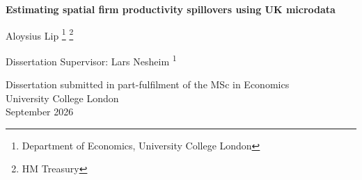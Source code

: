\begin{titlepage}
\vspace*{5cm}
\begin{center}
    \huge\textbf{
        Estimating spatial firm productivity spillovers using UK microdata
    }
\end{center}
\vspace{2.5cm}
\begin{center}
    Aloysius Lip
    \footnote{Department of Economics, University College London}
    \footnote{HM Treasury}
\end{center}
\vspace{2.5cm}
\begin{center}
    Dissertation Supervisor: Lars Nesheim
    \textsuperscript{1}
\end{center}
\vspace{2cm}
\begin{center}
    Dissertation submitted in part-fulfilment of the MSc in Economics\\[0.6em]
    University College London\\[0.6em]
    September 2026
\end{center}
\end{titlepage}
